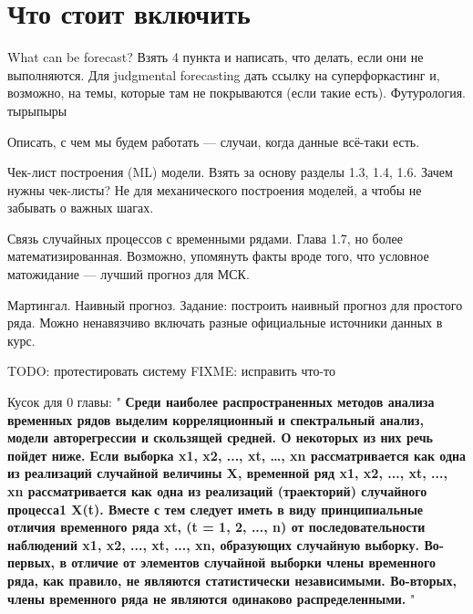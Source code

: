 \section{Что стоит включить}

What can be forecast? Взять 4 пункта и написать, что делать, если они
не выполняются. Для judgmental forecasting дать ссылку на
суперфоркастинг и, возможно, на темы, которые там не покрываются
(если такие есть). Футурология. тырыпыры

Описать, с чем мы будем работать — случаи, когда данные всё-таки есть.

Чек-лист построения (ML) модели. Взять за основу разделы 1.3, 1.4,
1.6. Зачем нужны чек-листы? Не для механического построения моделей,
а чтобы не забывать о важных шагах.

Связь случайных процессов с временными рядами. Глава 1.7, но более
математизированная. Возможно, упомянуть факты вроде того, что
условное матожидание — лучший прогноз для МСК.

Мартингал. Наивный прогноз.
Задание: построить наивный прогноз для простого ряда. Можно
ненавязчиво включать разные официальные источники данных в курс.

TODO: протестировать систему
FIXME: исправить что-то

Кусок для 0 главы:
"
\textbf{Среди наиболее распространенных методов анализа временных рядов выделим
корреляционный и спектральный анализ, модели авторегрессии и скользящей средней. О
некоторых из них речь пойдет ниже. Если выборка x1, x2, ..., xt, …, xn рассматривается как одна
из реализаций случайной величины X, временной ряд x1, x2, ..., xt, ..., xn рассматривается как одна
из реализаций (траекторий) случайного процесса1 X(t). Вместе с тем следует иметь в виду
принципиальные отличия временного ряда xt, (t = 1, 2, ..., n) от последовательности наблюдений
x1, x2, ..., xt, ..., xn, образующих случайную выборку.
Во-первых, в отличие от элементов случайной выборки члены временного ряда, как
правило, не являются статистически независимыми.
Во-вторых, члены временного ряда не являются одинаково распределенными.} "